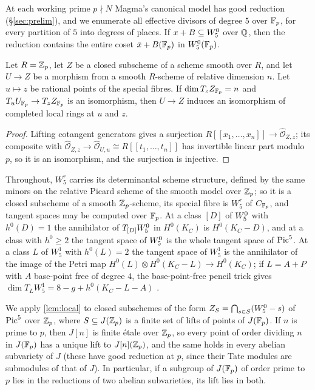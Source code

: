 At each working prime $p\nmid N$ Magma's canonical model has good reduction (\S\ref{sec:prelim}), and we
enumerate all effective divisors of degree $5$ over $\mathbb{F}_p$, for every partition of $5$ into degrees of places.
If $x+B\subseteq W^0_5$ over $\mathbb{Q}$, then the reduction contains the entire coset $\bar x+B(\mathbb{F}_p)$ in $W^0_5(\mathbb{F}_p)$.

\begin{lemma}\label{lem:local}
Let $R=\mathbb{Z}_p$, let $Z$ be a closed subscheme of a scheme smooth over $R$, and let $U\to Z$ be a morphism from a
smooth $R$-scheme of relative dimension $n$. Let $u\mapsto z$ be rational points of the special fibres. If
$\dim T_zZ_{\mathbb{F}_p}=n$ and $T_uU_{\mathbb{F}_p}\to T_zZ_{\mathbb{F}_p}$ is an isomorphism, then $U\to Z$ induces an isomorphism of
completed local rings at $u$ and $z$.
\end{lemma}
\begin{proof}
Lifting cotangent generators gives a surjection $R[[x_1,\dots,x_n]]\to\widehat{\mathcal O}_{Z,z}$; its
composite with $\widehat{\mathcal O}_{Z,z}\to\widehat{\mathcal O}_{U,u}\cong R[[t_1,\dots,t_n]]$ has invertible
linear part modulo $p$, so it is an isomorphism, and the surjection is injective.
\end{proof}
Throughout, $W^r_5$ carries its determinantal scheme structure, defined by the same minors on the relative
Picard scheme of the smooth model over $\mathbb{Z}_p$; so it is a closed subscheme of a smooth $\mathbb{Z}_p$-scheme, its special
fibre is $W^r_5$ of $C_{\mathbb{F}_p}$, and tangent spaces may be computed over $\mathbb{F}_p$. At a class $[D]$ of $W^0_5$ with
$h^0(D)=1$ the annihilator of $T_{[D]}W^0_5$ in $H^0(K_C)$ is $H^0(K_C-D)$, and at a class with $h^0\ge2$ the
tangent space of $W^0_5$ is the whole tangent space of $\operatorname{Pic}^5$. At a class $L$ of $W^1_5$ with $h^0(L)=2$ the
tangent space of $W^1_5$ is the annihilator of the image of the Petri map
$H^0(L)\otimes H^0(K_C-L)\to H^0(K_C)$; if $L=A+P$ with $A$ base-point free of degree $4$, the base-point-free
pencil trick gives $\dim T_LW^1_5=8-g+h^0(K_C-L-A)$ \cite[Chapter~IV, \S4]{ACGH1985}.

We apply \cref{lem:local} to closed subschemes of the form $Z_S=\bigcap_{s\in S}(W^0_5-s)$ of $\operatorname{Pic}^5$ over $\mathbb{Z}_p$,
where $S\subseteq J(\mathbb{Z}_p)$ is a finite set of lifts of points of $J(\mathbb{F}_p)$. If $n$ is prime to $p$, then $J[n]$ is
finite étale over $\mathbb{Z}_p$, so every point of order dividing $n$ in $J(\mathbb{F}_p)$ has a unique lift to $J[n](\mathbb{Z}_p)$, and
the same holds in every abelian subvariety of $J$ (these have good reduction at $p$, since their Tate modules are
submodules of that of $J$). In particular, if a subgroup of $J(\mathbb{F}_p)$ of order prime to $p$ lies in the
reductions of two abelian subvarieties, its lift lies in both.

